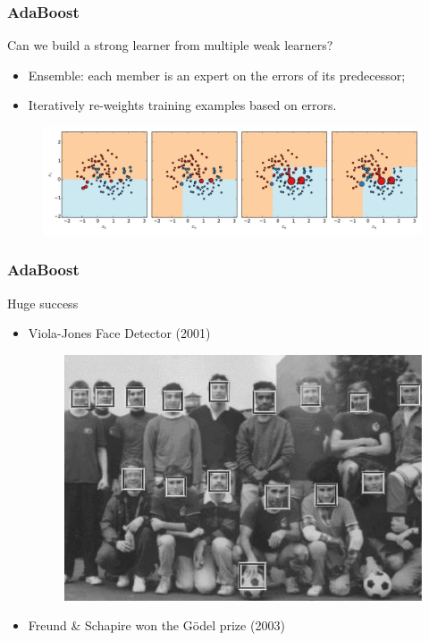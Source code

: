 \documentclass{beamer}
\begin{document}
\begin{frame}
  \frametitle{AdaBoost \citep{freund1995desicion}}

  Can we build a strong learner from multiple weak learners?

  \begin{itemize}
     \item Ensemble: each member is an expert on the errors of its predecessor;
     \item Iteratively re-weights training examples based on errors.
  \end{itemize}


  \begin{figure}
    \includegraphics[width=\textwidth,trim=0 0 0 10, clip=true]{figures/adaboost.pdf}
  \end{figure}

\end{frame}

\begin{frame}
  \frametitle{AdaBoost \citep{freund1995desicion}}

  \begin{center}
      {\Huge Huge success}
  \end{center}

  \begin{itemize}
     \item Viola-Jones Face Detector (2001)
     \begin{figure}
        \includegraphics[scale=0.3]{figures/viola-jones.png}
      \end{figure}
     \item Freund \& Schapire won the Gödel prize (2003)
  \end{itemize}

\end{frame}
\end{document}
